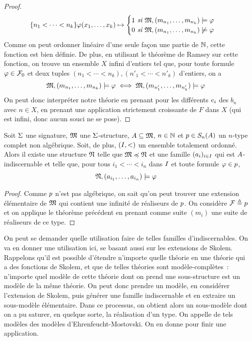 \begin{proof}
\[            {\{n_1 < \cdots < n_k\}}
            {\varphi(x_1,\ldots,x_k)\mapsto
              \begin{cases}
                1 \textit{ si } \mathfrak{M},(m_{n_1},\ldots,m_{n_k})\models\varphi\\
                0 \textit{ si } \mathfrak{M},(m_{n_1},\ldots,m_{n_k})\not\models\varphi\\
              \end{cases}
            }
            \]
  Comme on peut ordonner linéaire d'une seule façon une partie de $\mathbb N$, cette
  fonction est bien définie. De plus, en utilisant le théorème de Ramsey sur
  cette fonction, on trouve un ensemble $X$ infini d'entiers tel que, pour
  toute formule $\varphi\in\mathcal F_0$ et deux tuples
  $(n_1 < \cdots < n_k), (n'_1 < \cdots < n'_k)$ d'entiers, on a
  \[\mathfrak{M},(m_{n_1},\ldots,m_{n_k})\models \varphi\iff
  \mathfrak{M},(m_{n'_1},\ldots,m_{n'_k})\models\varphi\]
  On peut donc interpréter notre théorie en prenant pour les différents
  $\mathrm{c}_i$ des $b_{n}$ avec $n \in X$, en prenant une application strictement
  croissante de $F$ dans $X$ (qui est infini, donc aucun souci ne se pose).
\end{proof}

\begin{corollary}
  Soit $\Sigma$ une signature, $\mathfrak{M}$ une $\Sigma$-structure,
  $A\subseteq\mathfrak{M}$, $n \in \mathbb N$ et $p\in S_{n}(A)$
  un $n$-type complet non algébrique. Soit, de plus, $(I,<)$ un ensemble
  totalement ordonné. Alors il existe une structure $\mathfrak{N}$ telle que
  $\mathfrak{M}\preccurlyeq\mathfrak{N}$ et une famille $(a_i)_{i \in I}$ qui est
  $A$-indiscernable et telle que, pour tous $i_1 < \cdots < i_n$ dans
  $I$ et toute formule $\varphi\in p$,
  \[\mathfrak{N},(a_{i_1},\ldots,a_{i_n})\models\varphi\]
\end{corollary}

\begin{proof}
  Comme $p$ n'est pas algébrique, on sait qu'on peut trouver une
  extension élémentaire de $\mathfrak{M}$ qui contient une infinité de réaliseurs
  de $p$. On considère $\mathcal F \triangleq p$ et on applique
  le théorème précédent en prenant comme suite $(m_i)$ une suite de
  réaliseurs de ce type.
\end{proof}

On peut se demander quelle utilisation faire de telles familles
d'indiscernables. On va en donner une utilisation ici, se basant aussi sur les
extensions de Skolem. Rappelons qu'il est possible d'étendre n'importe quelle
théorie en une théorie qui a des fonctions de Skolem, et que de telles théories
sont modèle-complètes~: n'importe quel modèle de cette théorie dont on prend
une sous-structure est un modèle de la même théorie. On peut donc prendre un
modèle, en considérer l'extension de Skolem, puis générer une famille
indiscernable et en extraire un sous-modèle élémentaire. Dans ce processus, on
obtient alors un sous-modèle dont on a pu saturer, en quelque sorte, la
réalisation d'un type. On appelle de tels modèles des modèles
d'Ehrenfeucht-Mostovski. On en donne pour finir une application.

